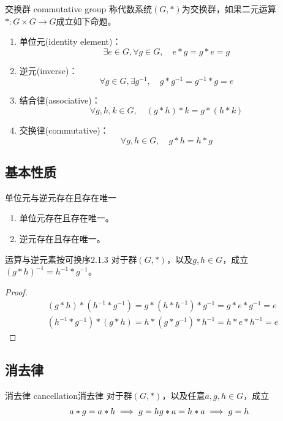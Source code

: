 \begin{definition}{交换群 commutative group}
	称代数系统$(G,*)$为交换群，如果二元运算$*:G\times G\to G$成立如下命题。
	\begin{enumerate}
		\item 单位元(identity element)：
		$$
		\exists e\in G,\forall g\in G,\quad e*g=g*e=g
		$$
		\item 逆元(inverse)：$$
		\forall g\in G,\exists g^{-1},\quad g*g^{-1}=g^{-1}*g=e
		$$
		\item 结合律(associative)：
		$$
		\forall g,h,k\in G,\quad (g*h)*k=g*(h*k)
		$$
		\item 交换律(commutative)：
		$$
		\forall g,h\in G,\quad g*h=h*g
		$$
	\end{enumerate}
\end{definition}

\subsection{基本性质}

\begin{proposition}{单位元与逆元存在且存在唯一}
	\begin{enumerate}
		\item 单位元存在且存在唯一。
		\item 逆元存在且存在唯一。
	\end{enumerate}
\end{proposition}

\begin{proposition}{运算与逆元素按可换序}{2.1.3}
	对于群$(G,*)$，以及$g,h\in G$，成立$(g*h)^{-1}=h^{-1}*g^{-1}$。
\end{proposition}

\begin{proof}
	\begin{align*}
		&(g*h)*(h^{-1}*g^{-1})=g*(h*h^{-1})*g^{-1}=g*e*g^{-1}=e\\
		&(h^{-1}*g^{-1})*(g*h)=h*(g*g^{-1})*h^{-1}=h*e*h^{-1}=e
	\end{align*}
\end{proof}

\subsection{消去律}

\begin{theorem}{消去律 cancellation}{消去律}
	对于群$(G,*)$，以及任意$a,g,h\in G$，成立
	$$
	a*g=a*h\implies g=h\\
	g*a=h*a\implies g=h
	$$
\end{theorem}

